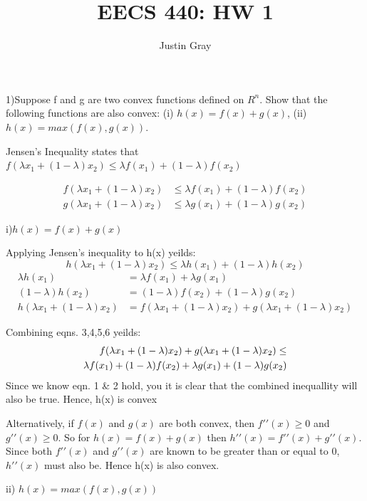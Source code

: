 \documentclass[12pt]{article}
\title{EECS 440: HW 1}
\author{Justin Gray}
\begin{document}
\maketitle

1)Suppose f and g are two convex functions defined on $R^n$. Show that the following functions are also convex: (i) $h(x)=f(x)+g(x)$, 
(ii) $h(x)=max(f(x),g(x))$.

Jensen's Inequality states that $f(\lambda x_1  +(1-\lambda)x_2) \leq \lambda f(x_1)+(1-\lambda)f(x_2)$  

\begin{align}  
f(\lambda x_1  +(1-\lambda)x_2 ) &\leq \lambda f(x_1)+(1-\lambda)f(x_2)\\
g(\lambda x_1  +(1-\lambda)x_2 ) &\leq \lambda g(x_1)+(1-\lambda)g(x_2)
\end{align} 

i)$h(x)=f(x)+g(x)$


Applying Jensen's inequality to h(x) yeilds: 
\begin{equation}
h(\lambda x_1  + (1 − \lambda) x_2 ) \leq \lambda h(x_1)+(1-\lambda)h(x_2)
\end{equation}
\begin{align}
    \lambda h(x_1) &= \lambda f(x_1) + \lambda g(x_1) \\
    (1-\lambda)h(x_2) &= (1-\lambda)f(x_2) + (1-\lambda)g(x_2) \\
    h(\lambda x_1  +(1−\lambda)x_2) &= f(\lambda x_1  +(1-\lambda)x_2) + g(\lambda x_1  +(1-\lambda)x_2)    
\end{align}

Combining eqns. 3,4,5,6 yeilds: 
\begin{align}
f(\lambda x_1  +(1-\lambda)x_2 ) + g(\lambda x_1  +(1-\lambda)x_2 ) \leq \\
\lambda f(x_1)+(1-\lambda)f(x_2) + \lambda g(x_1)+(1-\lambda)g(x_2) \notag
\end{align}
Since we know eqn. 1 \& 2 hold, you it is clear that the combined inequallity will also be true. Hence, h(x) is convex

Alternatively, if $f(x)$ and $g(x)$ are both convex, then $f\prime\prime(x) \geq 0$  and $g\prime\prime(x) \geq 0$. So for $h(x) = f(x) + g(x)$
then $h\prime\prime(x) = f\prime\prime(x) + g\prime\prime(x)$. Since both $f\prime\prime(x)$ and $g\prime\prime(x)$ are known to be greater than 
or equal to 0, $h\prime\prime(x)$ must also be. Hence h(x) is also convex. 


ii) $h(x)=max(f(x),g(x))$
\end{document}
